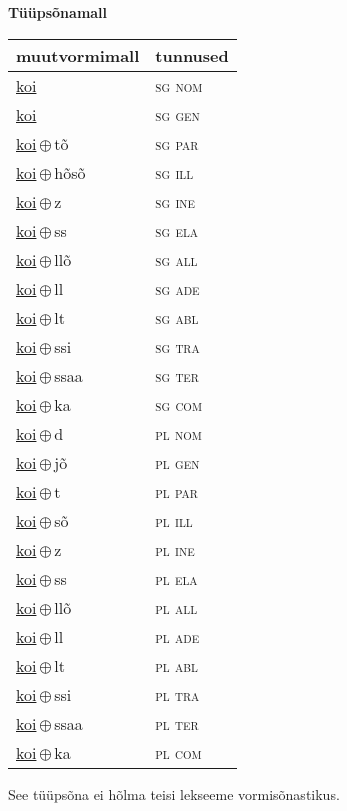 

\vspace{3.5em}
\noindent \begin{minipage}{\textwidth}
\noindent \textbf{Tüüpsõnamall \,}\\

\begin{sideways}
\begin{tabular}{l l}
muutvormimall & tunnused \\
\hline
\underline{koi} & \textsc{ sg nom } \\
\underline{koi} & \textsc{ sg gen } \\
\underline{koi}\,$\oplus$\,tõ & \textsc{ sg par } \\
\underline{koi}\,$\oplus$\,hõsõ & \textsc{ sg ill } \\
\underline{koi}\,$\oplus$\,z & \textsc{ sg ine } \\
\underline{koi}\,$\oplus$\,ss & \textsc{ sg ela } \\
\underline{koi}\,$\oplus$\,llõ & \textsc{ sg all } \\
\underline{koi}\,$\oplus$\,ll & \textsc{ sg ade } \\
\underline{koi}\,$\oplus$\,lt & \textsc{ sg abl } \\
\underline{koi}\,$\oplus$\,ssi & \textsc{ sg tra } \\
\underline{koi}\,$\oplus$\,ssaa & \textsc{ sg ter } \\
\underline{koi}\,$\oplus$\,ka & \textsc{ sg com } \\
\underline{koi}\,$\oplus$\,d & \textsc{ pl nom } \\
\underline{koi}\,$\oplus$\,jõ & \textsc{ pl gen } \\
\underline{koi}\,$\oplus$\,t & \textsc{ pl par } \\
\underline{koi}\,$\oplus$\,sõ & \textsc{ pl ill } \\
\underline{koi}\,$\oplus$\,z & \textsc{ pl ine } \\
\underline{koi}\,$\oplus$\,ss & \textsc{ pl ela } \\
\underline{koi}\,$\oplus$\,llõ & \textsc{ pl all } \\
\underline{koi}\,$\oplus$\,ll & \textsc{ pl ade } \\
\underline{koi}\,$\oplus$\,lt & \textsc{ pl abl } \\
\underline{koi}\,$\oplus$\,ssi & \textsc{ pl tra } \\
\underline{koi}\,$\oplus$\,ssaa & \textsc{ pl ter } \\
\underline{koi}\,$\oplus$\,ka & \textsc{ pl com } \\
\end{tabular}
\end{sideways}
\label{tab:tüüpsõnamall-koi}

\end{minipage}

 
\vspace{1em}
\noindent See tüüpsõna ei hõlma teisi lekseeme vormi\-sõnastikus.
